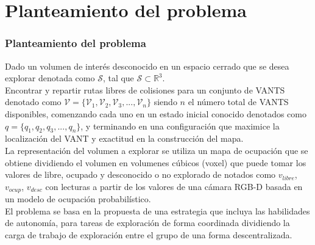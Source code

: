 \documentclass[
  24pt, %
  aspectratio=169, %
]{beamer}
\begin{document}
\section{Planteamiento del problema}
\begin{frame}
  \frametitle{Planteamiento del problema}
  \justifying
  \small Dado un volumen de interés desconocido en un espacio cerrado que se desea explorar denotada como $\mathcal{S}$, tal que $\mathcal{S} \subset \mathbb{R}^{3}$.\\
  Encontrar y repartir rutas libres de colisiones para un conjunto de VANTS denotado como $\mathcal{V} = \{\mathcal{V}_{1},\mathcal{V}_{2},\mathcal{V}_{3},...,\mathcal{V}_{n}\}$ siendo $n$ el número total de VANTS disponibles, comenzando cada uno en un estado inicial conocido denotados como $q = \{q_{1},q_{2},q_{3},...,q_{n}\}$, y terminando en una configuración que maximice la localización del VANT y exactitud en la construcción del mapa.\\

  La representación del volumen a explorar se utiliza un mapa de ocupación que se obtiene dividiendo el volumen en volumenes cúbicos (voxel) que puede tomar los valores de libre, ocupado y desconocido o no explorado de notados como $v_{libre}$, $v_{ocup}$, $v_{desc}$ con lecturas a partir de los valores de una cámara RGB-D basada en un modelo de ocupación probabilístico.\\

  \bigskip %
  El problema se basa en la propuesta de una estrategia que incluya las habilidades de autonomía, para tareas de exploración de forma coordinada dividiendo la carga de trabajo de exploración entre el grupo de una forma descentralizada.\\
  
    
  
  
\end{frame}
\end{document}
